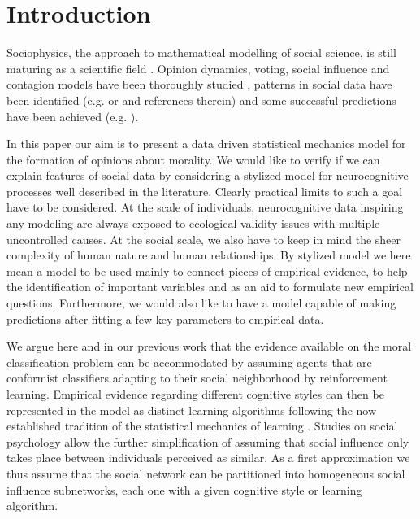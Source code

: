 \documentclass[twocolumn,showpacs]{revtex4-1}
\begin{document}
\section{\label{sec:intro} Introduction}


Sociophysics, the approach to mathematical modelling of social science,  is still maturing as a scientific field  \cite{GalamBook}. Opinion dynamics, voting, social influence and contagion models have been thoroughly studied \cite{Galam,Castellano}, patterns in social data have been identified (e.g. \cite{Bouchaud} or \cite{Fortunato} and references therein)  and  some successful predictions have been achieved (e.g. \cite{GalamQQ}).

In this paper our aim is to present a data driven  statistical mechanics model  for  the formation of opinions about morality. We would like to verify if we can explain  features of social data by considering  a stylized model for  neurocognitive processes  well described in the literature. Clearly practical limits to  such a goal have to be considered.  At the scale of individuals,  neurocognitive data inspiring any modeling are always exposed  to  ecological validity issues with multiple uncontrolled causes. At the social scale, we also have to keep in mind the sheer complexity of human nature and human
 relationships.  By stylized model we here mean a model to be used mainly  to connect  pieces of empirical evidence, to help the identification of important variables and as an aid to formulate new empirical questions. Furthermore, we would also like to have a model capable of making predictions after fitting a few key parameters  to empirical data. 


We argue here and in our previous work \cite{Cavi10} that the evidence available on the moral classification problem can be accommodated by assuming agents that are conformist classifiers adapting to their social neighborhood by reinforcement learning. Empirical evidence regarding different cognitive styles can then be represented in the model as distinct learning algorithms following the now established tradition 
of the statistical mechanics of learning \cite{Engel}. Studies on social psychology \cite{Spears} allow the further simplification of assuming  that social influence only takes place between individuals perceived as similar. As a first approximation we thus assume that the social network can be partitioned into homogeneous social influence subnetworks, each one with a given cognitive style or learning algorithm. 
\end{document}
